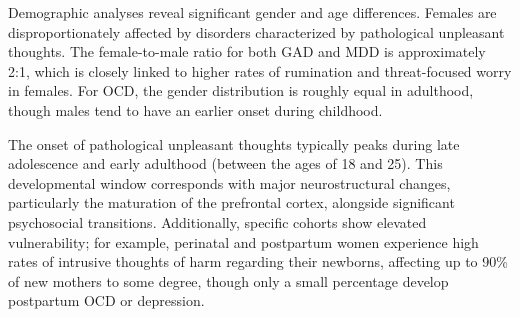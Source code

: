 Demographic analyses reveal significant gender and age differences. Females are disproportionately affected by disorders characterized by pathological unpleasant thoughts. The female-to-male ratio for both GAD and MDD is approximately 2:1, which is closely linked to higher rates of rumination and threat-focused worry in females. For OCD, the gender distribution is roughly equal in adulthood, though males tend to have an earlier onset during childhood.

The onset of pathological unpleasant thoughts typically peaks during late adolescence and early adulthood (between the ages of 18 and 25). This developmental window corresponds with major neurostructural changes, particularly the maturation of the prefrontal cortex, alongside significant psychosocial transitions. Additionally, specific cohorts show elevated vulnerability; for example, perinatal and postpartum women experience high rates of intrusive thoughts of harm regarding their newborns, affecting up to 90\% of new mothers to some degree, though only a small percentage develop postpartum OCD or depression.

